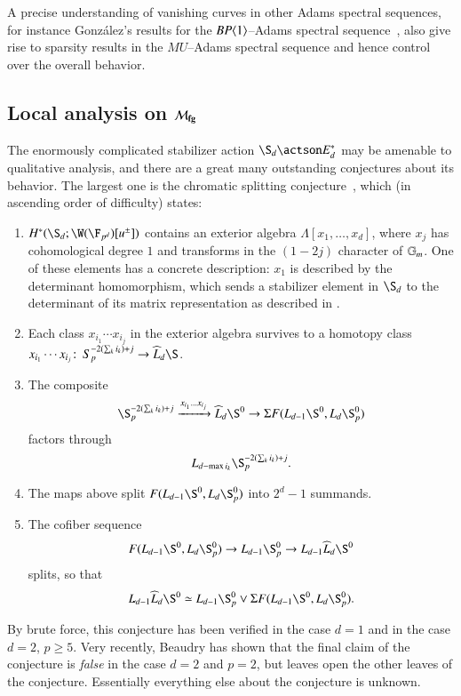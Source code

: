 A precise understanding of vanishing curves in other Adams spectral sequences, for instance Gonz\'{a}lez's results for the $BP\langle1\rangle$--Adams spectral sequence~\cite{Gonzalez}, also give rise to sparsity results in the $MU$--Adams spectral sequence and hence control over the overall behavior.







\subsection*{Local analysis on $\mathcal{M}_{\mathbf{fg}}$}

The enormously complicated stabilizer action $\S_d \actson E_d^*$ may be amenable to qualitative analysis, and there are a great many outstanding conjectures about its behavior.  The largest one is the chromatic splitting conjecture~\cite[Conjecture 4.2]{HoveyCSC}, which (in ascending order of difficulty) states:
\begin{enumerate}
    \item $H^*(\S_d; \W(\F_{p^d})[u^\pm])$ contains an exterior algebra $\Lambda[x_1, \ldots, x_d]$, where $x_j$ has cohomological degree $1$ and transforms in the $(1 - 2j)${\th} character of $\mathbb G_m$.  One of these elements has a concrete description: $x_1$ is described by the determinant homomorphism, which sends a stabilizer element in $\S_d$ to the determinant of its matrix representation as described in .
    \item Each class $x_{i_1} \cdots x_{i_j}$ in the exterior algebra survives to a homotopy class $x_{i_1} \cdots x_{i_j}\co S_p^{-2(\sum_k i_k)+j} \to \widehat L_d \S$.
    \item The composite \[\S_p^{-2(\sum_k i_k)+j} \xrightarrow{x_{i_1} \ldots x_{i_j}} \widehat L_d \S^0 \to \Susp F(L_{d-1} \S^0, L_d \S_p^0)\] factors through \[L_{d - \max i_k} \S_p^{-2(\sum_k i_k)+j}.\]
    \item The maps above split $F(L_{d-1} \S^0, L_d \S^0_p)$ into $2^d-1$ summands.
    \item The cofiber sequence \[F(L_{d-1} \S^0, L_d \S^0_p) \to L_{d-1} \S^0_p \to L_{d-1} \widehat L_d \S^0\] splits, so that \[L_{d-1} \widehat L_d \S^0 \simeq L_{d-1} \S^0_p \vee \Susp F(L_{d-1} \S^0, L_d \S^0_p).\]
\end{enumerate}
By brute force, this conjecture has been verified in the case $d = 1$ and in the case $d = 2$, $p \ge 5$.  Very recently, Beaudry has shown that the final claim of the conjecture is \emph{false} in the case $d = 2$ and $p = 2$, but leaves open the other leaves of the conjecture.  Essentially everything else about the conjecture is unknown.

